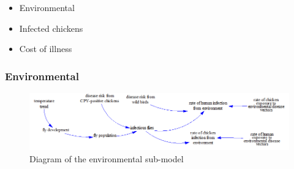 \begin{itemize}
    \item Environmental %
    \item Infected chickens %
    \item Cost of illness %

\end{itemize}

\subsubsection*{Environmental}

\begin{figure}[!ht]
	\centering
	\includegraphics[width=1\textwidth]{images/environmental_submodel2.png}
	\caption{Diagram of the environmental sub-model}
	\label{fig:environmental_submodel}
\end{figure}

